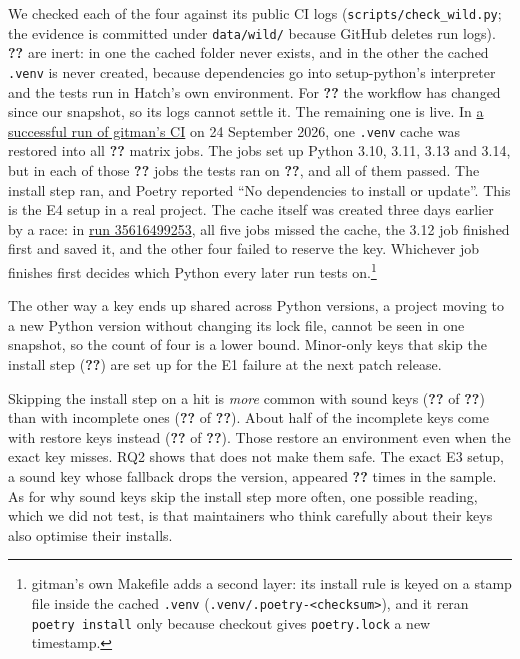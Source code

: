 \documentclass[10pt,a4paper]{article}
\newcommand{\ck}[1]{\textbf{??}}\newcommand{\repourl}{\url{https://github.com/mark124/cache-key-soundness}}%
\begin{document}
We checked each of the four against its public CI logs
(\texttt{scripts/check\_wild.py}; the evidence is committed under
\texttt{data/wild/} because GitHub deletes run logs). \ck{w.inert_shared_caches}
are inert: in one the cached folder never exists, and in the other the cached
\texttt{.venv} is never created, because dependencies go into setup-python's
interpreter and the tests run in Hatch's own environment. For
\ck{w.undetermined_shared_caches} the workflow has changed since our snapshot,
so its logs cannot settle it. The remaining one is live. In
\href{https://github.com/jacebrowning/gitman/actions/runs/35938984458}{a
successful run of gitman's CI} on 24 September 2026, one \texttt{.venv} cache
was restored into all \ck{w.wild_jobs_in_live_run} matrix jobs. The jobs set
up Python 3.10, 3.11, 3.13 and 3.14, but in each of those
\ck{w.wild_jobs_wrong_python} jobs the tests ran on
\ck{w.wild_tests_ran_on}, and all of them passed. The install step ran, and
Poetry reported ``No dependencies to install or update''. This is the E4
setup in a real project. The cache itself was created three days earlier by a
race: in \href{https://github.com/jacebrowning/gitman/actions/runs/35616499253}{run
35616499253}, all five jobs missed the cache, the 3.12 job finished first and
saved it, and the other four failed to reserve the key. Whichever job finishes
first decides which Python every later run tests on.\footnote{gitman's own Makefile adds a second layer:
its install rule is keyed on a stamp file inside the cached
\texttt{.venv} (\texttt{.venv/.poetry-<checksum>}), and it reran
\texttt{poetry install} only because checkout gives \texttt{poetry.lock} a new
timestamp.}

The other way a key ends up shared across Python versions, a project moving to a new Python
version without changing its lock file, cannot be seen in one snapshot, so the
count of four is a lower bound. Minor-only keys that skip the install step
(\ck{h.minor_only_with_skip}) are set up for the E1 failure at the next patch
release.

Skipping the install step on a hit is \emph{more} common with sound keys
(\ck{h.sound_with_skip} of \ck{h.sound_steps}) than with incomplete ones
(\ck{h.unsound_with_skip} of \ck{h.unsound_steps}). About half of the
incomplete keys come with restore keys instead
(\ck{h.unsound_with_restore_keys} of \ck{h.unsound_steps}). Those restore an
environment even when the exact key misses. RQ2 shows that does not make them
safe. The exact E3 setup, a sound key whose fallback drops the version,
appeared \ck{h.sound_steps_with_restore_key_fallback_hazard} times in the
sample. As for why sound keys skip the install step more often, one possible
reading, which we did not test, is that maintainers who think carefully about
their keys also optimise their installs.
\end{document}
